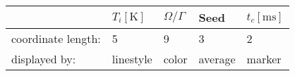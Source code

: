 \begin{tabular}{lllll}
\hline
                    & $T_i \mathrm{[K]}$   & $\Omega/\Gamma$   & Seed    & $t_c \mathrm{[ms]}$   \\
\hline
 coordinate length: & 5                    & 9                 & 3       & 2                     \\
 displayed by:      & linestyle            & color             & average & marker                \\
\hline
\end{tabular}
